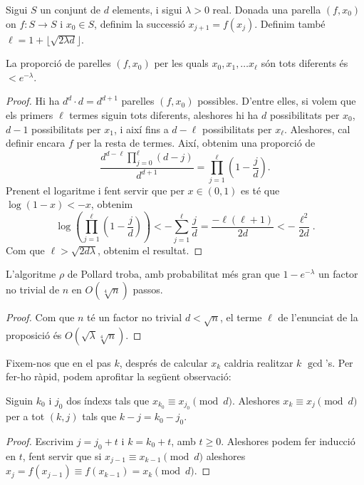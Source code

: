  \begin{proposition}
  Sigui $S$ un conjunt de $d$ elements, i sigui $\lambda>0$ real. Donada una parella $(f,x_0)$ on $f\colon S\to S$ i $x_0\in S$, definim la successió $x_{j+1}=f(x_j)$. Definim també $\ell=1+\lfloor \sqrt{2\lambda d}\rfloor$.
  
  La proporció de parelles $(f,x_0)$ per les quals $x_0,x_1,\ldots x_\ell$ són tots diferents és $<e^{-\lambda}$.
 \end{proposition}
 \begin{proof}
  Hi ha $d^d\cdot d = d^{d+1}$ parelles $(f,x_0)$ possibles. D'entre elles, si volem que els primers $\ell$ termes siguin tots diferents, aleshores hi ha $d$ possibilitats per $x_0$, $d-1$ possibilitats per $x_1$, i així fins a $d-\ell$ possibilitats per $x_\ell$. Aleshores, cal definir encara $f$ per la resta de termes. Així, obtenim una proporció de
 \[
 \frac{d^{d-\ell}\prod_{j=0}^\ell (d-j)}{d^{d+1}} = \prod_{j=1}^\ell \left(1-\frac{j}{d}\right).
 \]
 Prenent el logaritme i fent servir que per $x\in (0,1)$ es té que $\log(1-x)<-x$, obtenim
 \[
 \log \left(\prod_{j=1}^\ell \left(1-\frac jd\right)\right) < -\sum_{j=1}^\ell \frac{j}{d} = \frac{-\ell(\ell+1)}{2d} < -\frac{\ell^2}{2d}.
 \]
 Com que $\ell > \sqrt{2d\lambda}$, obtenim el resultat.
 \end{proof}
 \begin{corollary}
 L'algoritme $\rho$ de Pollard troba, amb probabilitat més gran que $1-e^{-\lambda}$ un factor no trivial de $n$ en $O(\sqrt[4]{n})$ passos.
 \end{corollary}
 \begin{proof}
  Com que $n$ té un factor no trivial $d<\sqrt{n}$, el terme $\ell$ de l'enunciat de la proposició és $O\left(\sqrt{\lambda}\sqrt[4]{n}\right)$.
 \end{proof}
 
 Fixem-nos que en el pas $k$, després de calcular $x_k$ caldria realitzar $k$ $\gcd$'s. Per fer-ho ràpid, podem aprofitar la següent observació:
 
 \begin{lemma}
 Siguin $k_0$ i $j_0$ dos índexs tals que $x_{k_0}\equiv x_{j_0}\pmod{d}$. Aleshores $x_k\equiv x_j\pmod{d}$ per a tot $(k,j)$ tals que $k-j=k_0-j_0$.
 \end{lemma}
 \begin{proof}
  Escrivim $j=j_0+t$ i $k=k_0+t$, amb $t\geq 0$. Aleshores podem fer inducció en $t$, fent servir que si $x_{j-1}\equiv x_{k-1}\pmod{d}$ aleshores $x_j=f(x_{j-1})\equiv f(x_{k-1})=x_k\pmod d$.
 \end{proof}
 

